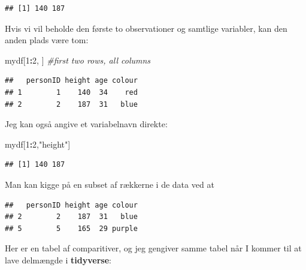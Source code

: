 \documentclass[
]{book}
\newenvironment{Shaded}{\begin{snugshade}}{\end{snugshade}}
\newcommand{\CommentTok}[1]{\textcolor[rgb]{0.56,0.35,0.01}{\textit{#1}}}
\newcommand{\DecValTok}[1]{\textcolor[rgb]{0.00,0.00,0.81}{#1}}
\newcommand{\NormalTok}[1]{#1}
\newcommand{\SpecialCharTok}[1]{\textcolor[rgb]{0.81,0.36,0.00}{\textbf{#1}}}
\newcommand{\StringTok}[1]{\textcolor[rgb]{0.31,0.60,0.02}{#1}}
\begin{document}
\begin{verbatim}
## [1] 140 187
\end{verbatim}

Hvis vi vil beholde den første to observationer og samtlige variabler, kan den anden plads være tom:

\begin{Shaded}
\begin{Highlighting}[]
\NormalTok{mydf[}\DecValTok{1}\SpecialCharTok{:}\DecValTok{2}\NormalTok{, ]  }\CommentTok{\#first two rows, all columns}
\end{Highlighting}
\end{Shaded}

\begin{verbatim}
##   personID height age colour
## 1        1    140  34    red
## 2        2    187  31   blue
\end{verbatim}

Jeg kan også angive et variabelnavn direkte:

\begin{Shaded}
\begin{Highlighting}[]
\NormalTok{mydf[}\DecValTok{1}\SpecialCharTok{:}\DecValTok{2}\NormalTok{,}\StringTok{"height"}\NormalTok{]}
\end{Highlighting}
\end{Shaded}

\begin{verbatim}
## [1] 140 187
\end{verbatim}

Man kan kigge på en subset af rækkerne i de data ved at

\begin{Shaded}
\end{Shaded}

\begin{verbatim}
##   personID height age colour
## 2        2    187  31   blue
## 5        5    165  29 purple
\end{verbatim}

Her er en tabel af comparitiver, og jeg gengiver samme tabel når I kommer til at lave delmængde i \textbf{tidyverse}:
\end{document}
